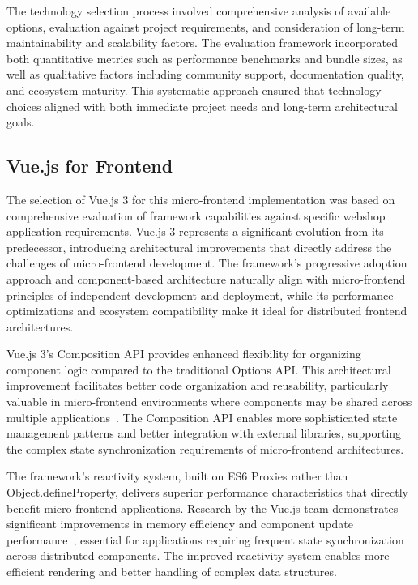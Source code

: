 \documentclass[12pt,a4paper]{report}
\begin{document}
The technology selection process involved comprehensive analysis of available options, evaluation against project requirements, and consideration of long-term maintainability and scalability factors. The evaluation framework incorporated both quantitative metrics such as performance benchmarks and bundle sizes, as well as qualitative factors including community support, documentation quality, and ecosystem maturity. This systematic approach ensured that technology choices aligned with both immediate project needs and long-term architectural goals.

\subsection{Vue.js for Frontend}

The selection of Vue.js 3 for this micro-frontend implementation was based on comprehensive evaluation of framework capabilities against specific webshop application requirements. Vue.js 3 represents a significant evolution from its predecessor, introducing architectural improvements that directly address the challenges of micro-frontend development. The framework's progressive adoption approach and component-based architecture naturally align with micro-frontend principles of independent development and deployment, while its performance optimizations and ecosystem compatibility make it ideal for distributed frontend architectures.

Vue.js 3's Composition API provides enhanced flexibility for organizing component logic compared to the traditional Options API. This architectural improvement facilitates better code organization and reusability, particularly valuable in micro-frontend environments where components may be shared across multiple applications~\cite{vuejs2023}. The Composition API enables more sophisticated state management patterns and better integration with external libraries, supporting the complex state synchronization requirements of micro-frontend architectures.

The framework's reactivity system, built on ES6 Proxies rather than Object.defineProperty, delivers superior performance characteristics that directly benefit micro-frontend applications. Research by the Vue.js team demonstrates significant improvements in memory efficiency and component update performance~\cite{vuejs2023}, essential for applications requiring frequent state synchronization across distributed components. The improved reactivity system enables more efficient rendering and better handling of complex data structures.
\end{document}
